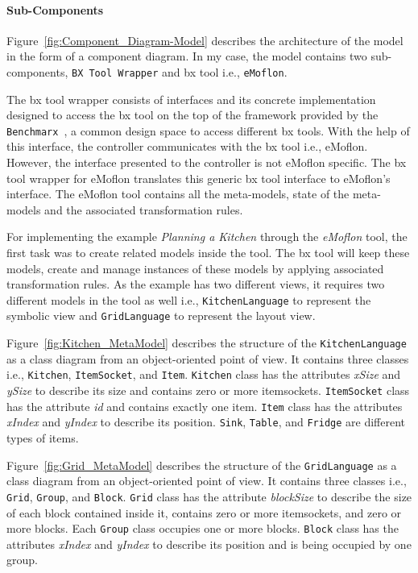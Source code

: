 \paragraph{Sub-Components}
Figure~\ref{fig:Component_Diagram-Model} describes the architecture of the model in the form of a component diagram. In my case, the model contains two sub-components, \texttt{BX Tool Wrapper} and bx tool i.e., \texttt{eMoflon}. 

The bx tool wrapper consists of interfaces and its concrete implementation designed to access the bx tool on the top of the framework provided by the \texttt{Benchmarx}~\cite{benchmarx-reload}, a common design space to access different bx tools. With the help of this interface, the controller communicates with the bx tool i.e., eMoflon. However, the interface presented to the controller is not eMoflon specific. The bx tool wrapper for eMoflon translates this generic bx tool interface to eMoflon's interface. The eMoflon tool contains all the meta-models, state of the meta-models and the associated transformation rules.

For implementing the example \textit{Planning a Kitchen} through the \textit{eMoflon} tool, the first task was to create related models inside the tool. The bx tool will keep these models, create and manage instances of these models by applying associated transformation rules. As the example has two different views, it requires two different models in the tool as well i.e., \texttt{KitchenLanguage} to represent the symbolic view and \texttt{GridLanguage} to represent the layout view.

Figure~\ref{fig:Kitchen_MetaModel} describes the structure of the \texttt{KitchenLanguage} as a class diagram from an object-oriented point of view. It contains three classes i.e., \texttt{Kitchen}, \texttt{ItemSocket}, and \texttt{Item}. \texttt{Kitchen} class has the attributes \textit{xSize} and \textit{ySize} to describe its size and contains zero or more itemsockets. \texttt{ItemSocket} class has the attribute \textit{id} and contains exactly one item. \texttt{Item} class has the attributes \textit{xIndex} and \textit{yIndex} to describe its position. \texttt{Sink}, \texttt{Table}, and \texttt{Fridge} are different types of items.

Figure~\ref{fig:Grid_MetaModel} describes the structure of the \texttt{GridLanguage} as a class diagram from an object-oriented point of view. It contains three classes i.e., \texttt{Grid}, \texttt{Group}, and \texttt{Block}. \texttt{Grid} class has the attribute \textit{blockSize} to describe the size of each block contained inside it, contains zero or more itemsockets, and zero or more blocks. Each \texttt{Group} class occupies one or more blocks. \texttt{Block} class has the attributes \textit{xIndex} and \textit{yIndex} to describe its position and is being occupied by one group.

